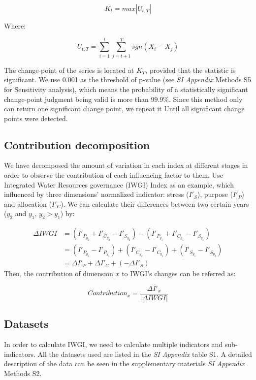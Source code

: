 \documentclass[9pt, twocolumn, twoside, lineno]{pnas-new}
\begin{document}
{		$$ K_t = max|U_{t, T}|$$

		Where:

		$$ U_{t, T} = \sum_{i=1}^t\sum_{j=t+1}^T sgn(X_i - X_j) $$
	
		The change-point of the series is located at $K_T$, provided that the statistic is significant. We use 0.001 as the threshold  of p-value (see \textit{SI Appendix} Methods S5 for Sensitivity analysis), which means the probability of a statistically significant change-point judgment being valid is more than $99.9\%$.
		Since this method only can return one significant change point, we repeat it Until all significant change points were detected.
	
	\subsection*{Contribution decomposition}
		We have decomposed the amount of variation in each index at different stages in order to observe the contribution of each influencing factor to them. Use Integrated Water Resources governance (IWGI) Index as an example, which influenced by three dimensions' normalized indicator: stress ($I'_S$), purpose ($I'_P$) and allocation ($I'_C$). We can calculate their differences between two certain years ($y_2$ and $y_1$, $y_2 > y_1$) by:

		\begin{align*}
			\Delta IWGI &= (I'_{P_{y_2}} + I'_{C_{y_2}} - I'_{S_{y_2}}) - (I'_{P_{y_1}} + I'_{C_{y_1}} - I'_{S_{y_1}}) \\
			&= (I'_{P_{y_2}} - I'_{P_{y_1}}) + (I'_{C_{y_2}} - I'_{C_{y_1}}) + (I'_{S_{y_1}} - I'_{S_{y_2}}) \\
			&= \Delta I'_P + \Delta I'_C + (-\Delta I'_S)
		\end{align*}
		Then, the contribution of dimension $x$ to IWGI's changes can be referred as:

		$$ Contribution_x = \frac{\Delta I'_x}{|\Delta IWGI|} $$



	\subsection*{Datasets}
	In order to calculate IWGI, we need to calculate multiple indicators and sub-indicators. All the datasets used are listed in the \textit{SI Appendix} table S1. A detailed description of the data can be seen in the supplementary materials \textit{SI Appendix} Methods S2.
}
\end{document}

